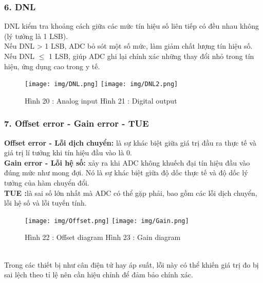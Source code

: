 \documentclass[a4paper,13pt]{article}
\begin{document}
\subsubsection*{6. DNL}
DNL kiểm tra khoảng cách giữa các mức tín hiệu số liên tiếp có đều nhau không (lý tưởng là 1 LSB).\\
Nếu DNL > 1 LSB, ADC bỏ sót một số mức, làm giảm chất lượng tín hiệu số.\\
Nếu DNL \(\le\) 1 LSB, giúp ADC ghi lại chính xác những thay đổi nhỏ trong tín hiệu, ứng dụng cao trong y tế.

\begin{figure}[htbp]
    \texttt{[image: img/DNL.png]}
    \texttt{[image: img/DNL2.png]}
    \caption*{Hình 20 : Analog input \cite{key3}\hspace{50} Hình 21 : Digital output\cite{key3} }
\end{figure}

\subsubsection*{7. Offset error - Gain error - TUE}
\textbf{Offset error - Lỗi dịch chuyển:} là sự khác biệt giữa giá trị đầu ra thực tế và giá trị lí tưởng khi tín hiệu đầu vào là 0.\\
\textbf{Gain error - Lỗi hệ số:} xảy ra khi ADC không khuếch đại tín hiệu đầu vào đúng mức như mong đợi. Nó là sự khác biệt giữa độ dốc thực tế và độ dốc lý tưởng của hàm chuyển đổi.\\
\textbf{TUE :}là sai số lớn nhất mà ADC có thể gặp phải, bao gồm các lỗi dịch chuyển, lỗi hệ số và lỗi tuyến tính.
\begin{figure}[htbp]

    \texttt{[image: img/Offset.png]}
    \texttt{[image: img/Gain.png]}
    \caption*{Hình 22 : Offset diagram \cite{key3}\hspace{50} Hình 23 : Gain diagram \cite{key3}}
\end{figure}\\
Trong các thiết bị như cân điện tử hay áp suất, lỗi này có thể khiến giá trị đo bị sai lệch theo tỉ lệ nên cần hiệu chỉnh để đảm bảo chính xác.\\
\end{document}
